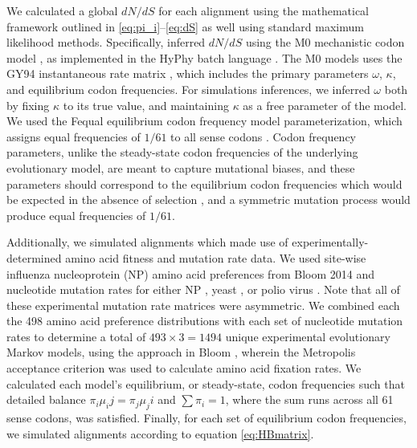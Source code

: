 \documentclass{pnastwo}
\begin{document}
\begin{article}
We calculated a global $dN/dS$ for each alignment using the mathematical framework outlined in \eqref{eq:pi_i}--\eqref{eq:dS} as well using standard maximum likelihood methods. Specifically, inferred $dN/dS$ using the M0 mechanistic codon model \cite{Yangetal2000}, as implemented in the HyPhy batch language \cite{KosakovskyPondetal2005}. The M0 models uses the GY94 instantaneous rate matrix \cite{GoldmanYang1994,NielsenYang1998}, which includes the primary parameters $\omega$, $\kappa$, and equilibrium codon frequencies. For simulations inferences, we inferred $\omega$ both by fixing $\kappa$ to its true value, and maintaining $\kappa$ as a free parameter of the model. We used the Fequal equilibrium codon frequency model parameterization, which assigns equal frequencies of $1/61$ to all sense codons \cite{Yang2006}. Codon frequency parameters, unlike the steady-state codon frequencies of the underlying evolutionary model, are meant to capture mutational biases, and these parameters should correspond to the equilibrium codon frequencies which would be expected in the absence of selection \cite{YN00}, and a symmetric mutation process would produce equal frequencies of $1/61$.


Additionally, we simulated alignments which made use of experimentally-determined amino acid fitness and mutation rate data. We used site-wise influenza nucleoprotein (NP) amino acid preferences from Bloom 2014 \cite{Bloom2014a} and nucleotide mutation rates for either NP \cite{Bloom2014a}, yeast \cite{Zhu2014}, or polio virus \cite{Acevedo2014}. Note that all of these experimental mutation rate matrices were asymmetric. We combined each the 498 amino acid preference distributions with each set of nucleotide mutation rates to determine a total of $493 \times 3 = 1494$ unique experimental evolutionary Markov models, using the approach in Bloom \cite{Bloom2014a}, wherein the Metropolis acceptance criterion \cite{Metropolis1953} was used to calculate amino acid fixation rates. We calculated each model's equilibrium, or steady-state, codon frequencies such that detailed balance $\pi_i\mu_ij = \pi_j\mu_ji$ and $\sum\pi_i = 1$, where the sum runs across all 61 sense codons, was satisfied. Finally, for each set of equilibrium codon frequencies, we simulated alignments according to equation \eqref{eq:HBmatrix}.


\end{article}
\end{document}
